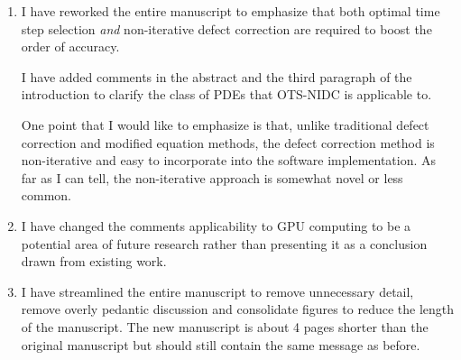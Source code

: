 \documentclass[12pt]{article}
\begin{document}
\begin{enumerate}

\item I have reworked the entire manuscript to emphasize that both optimal time
      step selection \emph{and} non-iterative defect correction are required to 
      boost the order of accuracy.  

      I have added comments in the abstract and the third paragraph of the
      introduction to clarify the class of PDEs that OTS-NIDC is applicable to.
    
      One point that I would like to emphasize is that, unlike traditional
      defect correction and modified equation methods, the defect correction
      method is non-iterative and easy to incorporate into the software
      implementation.  As far as I can tell, the non-iterative approach is
      somewhat novel or less common.

\item I have changed the comments applicability to GPU computing to be a 
      potential area of future research rather than presenting it as a
      conclusion drawn from existing work.
    
\item I have streamlined the entire manuscript to remove unnecessary detail,
      remove overly pedantic discussion and consolidate figures to reduce the
      length of the manuscript.  The new manuscript is about 4 pages shorter
      than the original manuscript but should still contain the same message
      as before.

\end{enumerate}
\end{document}
